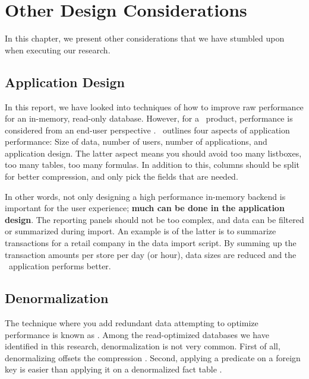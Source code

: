 \chapter{Other Design Considerations}
\label{chap:Other Design Considerations}
In this chapter, we present other considerations that we have stumbled upon when executing our research.
\newpage

\section{Application Design}
\label{sec:Application Design}
In this report, we have looked into techniques of how to improve raw performance for an in-memory, read-only database. However, for a \bd~product, performance is considered from an end-user perspective \cite{Qlik2011-yc}. \qlikview~outlines four aspects of application performance: Size of data, number of users, number of applications, and application design. The latter aspect means you should avoid too many listboxes, too many tables, too many formulas. In addition to this, columns should be split for better compression, and only pick the fields that are needed.

In other words, not only designing a high performance in-memory backend is important for the user experience; \textbf{much can be done in the application design}. The reporting panels should not be too complex, and data can be filtered or summarized during import. An example is of the latter is to summarize transactions for a retail company in the data import script. By summing up the transaction amounts per store per day (or hour), data sizes are reduced and the \bd~application performs better.

\section{Denormalization}
\label{sec:Denormalization}
The technique where you add redundant data attempting to optimize performance is known as  \cite{Raman2008-gi, Wikipedia_contributors2015-az}. Among the read-optimized databases we have identified in this research, denormalization is not very common. First of all, denormalizing offsets the compression \cite{Barber2012-xt}. Second, applying a predicate on a foreign key is easier than applying it on a denormalized fact table \cite{Abadi2008-dd}. 

